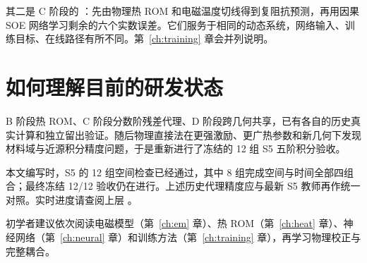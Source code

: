 其二是 C 阶段的 ：先由物理热 ROM 和电磁温度切线得到复阻抗预测，再用因果 SOE 网络学习剩余的六个实数误差。它们服务于相同的动态系统，网络输入、训练目标、在线路径有所不同。第~\ref{ch:training} 章会并列说明。

\section{如何理解目前的研发状态}
B 阶段热 ROM、C 阶段分数阶残差代理、D 阶段跨几何共享，已有各自的历史真实计算和独立留出验证。随后物理直接法在更强激励、更广热参数和新几何下发现材料域与近源积分精度问题，于是重新进行了冻结的 12 组 S5 五阶积分验收。

本文编写时，S5 的 12 组空间检查已经通过，其中 8 组完成空间与时间全部四组合；最终冻结 12/12 验收仍在进行。上述历史代理精度应与最新 S5 教师再作统一对照。实时进度请查阅上层 。

初学者建议依次阅读电磁模型（第~\ref{ch:em} 章）、热 ROM（第~\ref{ch:heat} 章）、神经网络（第~\ref{ch:neural} 章）和训练方法（第~\ref{ch:training} 章），再学习物理校正与完整耦合。
